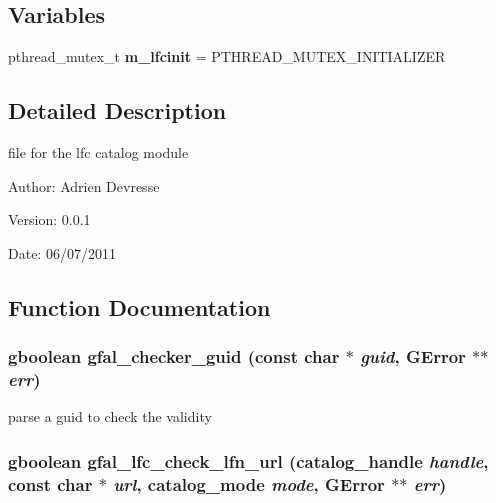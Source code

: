 \subsection*{Variables}
\begin{CompactItemize}
\item 
pthread\_\-mutex\_\-t \textbf{m\_\-lfcinit} = PTHREAD\_\-MUTEX\_\-INITIALIZER\label{gfal__common__lfc_8c_a683cb37b7f14c7d477e4653816d20df}

\end{CompactItemize}


\subsection{Detailed Description}
file for the lfc catalog module 

\begin{Desc}
\item[Author:]Adrien Devresse \end{Desc}
\begin{Desc}
\item[Version:]0.0.1 \end{Desc}
\begin{Desc}
\item[Date:]06/07/2011 \end{Desc}


\subsection{Function Documentation}
\subsubsection{\setlength{\rightskip}{0pt plus 5cm}gboolean gfal\_\-checker\_\-guid (const char $\ast$ {\em guid}, GError $\ast$$\ast$ {\em err})}\label{gfal__common__lfc_8c_c7f9448e809d5c82f58288d1491dc2d0}


parse a guid to check the validity 
\subsubsection{\setlength{\rightskip}{0pt plus 5cm}gboolean gfal\_\-lfc\_\-check\_\-lfn\_\-url (catalog\_\-handle {\em handle}, const char $\ast$ {\em url}, catalog\_\-mode {\em mode}, GError $\ast$$\ast$ {\em err})}\label{gfal__common__lfc_8c_58b6554069edac9b0626fb3ea9c7f851}


